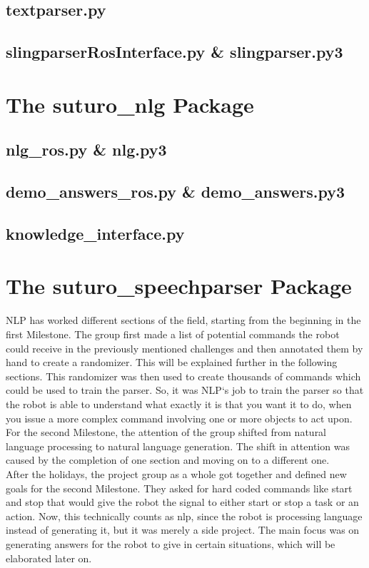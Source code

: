 \documentclass[main.tex]{subfiles}
\begin{document}
		\subsection{textparser.py}
		\subsection{slingparserRosInterface.py \& slingparser.py3}		
	
	\section{The suturo\_nlg Package}
		\subsection{nlg\_ros.py \& nlg.py3}
		\subsection{demo\_answers\_ros.py \& demo\_answers.py3}
		\subsection{knowledge\_interface.py}
			
	\section{The suturo\_speechparser Package}
		
		
		
			
	NLP has worked different sections of the field, starting from the beginning in the first Milestone. The group first made a list of potential commands the robot could receive in the previously mentioned challenges and then annotated them by hand to create a randomizer. This will be explained further in the following sections. This randomizer was then used to create thousands of commands which could be used to train the parser. So, it was NLP‘s job to train the parser so that the robot is able to understand what exactly it is that you want it to do, when you issue a more complex command involving one or more objects to act upon.\\ 
	For the second Milestone, the attention of the group shifted from natural language processing to natural language generation. The shift in attention was caused by the completion of one section and moving on to a different one.\\ 
	After the holidays, the project group as a whole got together and defined new goals for the second Milestone. They asked for hard coded commands like start and stop that would give the robot the signal to either start or stop a task or an action. Now, this technically counts as nlp, since the robot is processing language instead of generating it, but it was merely a side project. The main focus was on generating answers for the robot to give in certain situations, which will be elaborated later on.
		
\end{document}
